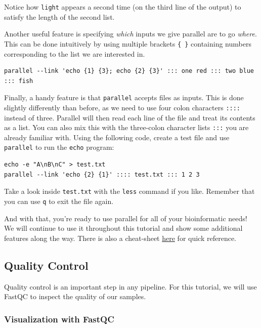 \documentclass[
]{book}
\begin{document}
Notice how \texttt{light} appears a second time (on the third line of the output) to satisfy the length of the second list.

Another useful feature is specifying \emph{which} inputs we give parallel are to go \emph{where}. This can be done intuitively by using multiple brackets \texttt{\{\ \}} containing numbers corresponding to the list we are interested in.

\begin{verbatim}
parallel --link 'echo {1} {3}; echo {2} {3}' ::: one red ::: two blue ::: fish
\end{verbatim}

Finally, a handy feature is that \texttt{parallel} accepts files as inputs. This is done slightly differently than before, as we need to use four colon characters \texttt{::::} instead of three. Parallel will then read each line of the file and treat its contents as a list. You can also mix this with the three-colon character lists \texttt{:::} you are already familiar with. Using the following code, create a test file and use \texttt{parallel} to run the \texttt{echo} program:

\begin{verbatim}
echo -e "A\nB\nC" > test.txt
parallel --link 'echo {2} {1}' :::: test.txt ::: 1 2 3
\end{verbatim}

Take a look inside \texttt{test.txt} with the \texttt{less} command if you like. Remember that you can use \texttt{q} to exit the file again.

And with that, you're ready to use parallel for all of your bioinformatic needs! We will continue to use it throughout this tutorial and show some additional features along the way. There is also a cheat-sheet \href{https://www.gnu.org/software/parallel/parallel_cheat.pdf}{here} for quick reference.

\subsection{Quality Control}\label{quality-control}

Quality control is an important step in any pipeline. For this tutorial, we will use FastQC to inspect the quality of our samples.

\subsubsection{Visualization with FastQC}\label{visualization-with-fastqc}
\end{document}
